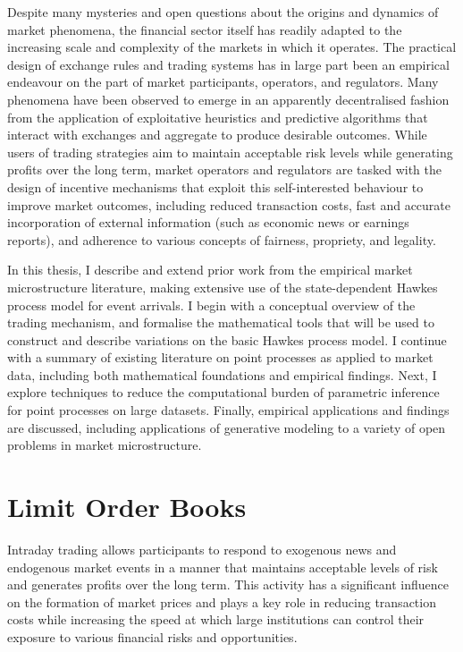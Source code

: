 \documentclass[honours,12pt]{unswthesis}
\numberwithin{equation}{section}
\begin{document}
Despite many mysteries and open questions about the origins and dynamics of market phenomena, the financial sector itself has readily adapted to the increasing scale and complexity of the markets in which it operates. The practical design of exchange rules and trading systems has in large part been an empirical endeavour on the part of market participants, operators, and regulators. Many phenomena have been observed to emerge in an apparently decentralised fashion from the application of exploitative heuristics and predictive algorithms that interact with exchanges and aggregate to produce desirable outcomes. While users of trading strategies aim to maintain acceptable risk levels while generating profits over the long term, market operators and regulators are tasked with the design of incentive mechanisms that exploit this self-interested behaviour to improve market outcomes, including reduced transaction costs, fast and accurate incorporation of external information (such as economic news or earnings reports), and adherence to various concepts of fairness, propriety, and legality.

In this thesis, I describe and extend prior work from the empirical market microstructure literature, making extensive use of the state-dependent Hawkes process model for event arrivals. I begin with a conceptual overview of the trading mechanism, and formalise the mathematical tools that will be used to construct and describe variations on the basic Hawkes process model. I continue with a summary of existing literature on point processes as applied to market data, including both mathematical foundations and empirical findings. Next, I explore techniques to reduce the computational burden of parametric inference for point processes on large datasets. Finally, empirical applications and findings are discussed, including applications of generative modeling to a variety of open problems in market microstructure.


\section{Limit Order Books}
Intraday trading allows participants to respond to exogenous news and endogenous market events in a manner that maintains acceptable levels of risk and generates profits over the long term. This activity has a significant influence on the formation of market prices and plays a key role in reducing transaction costs while increasing the speed at which large institutions can control their exposure to various financial risks and opportunities.
\end{document}
